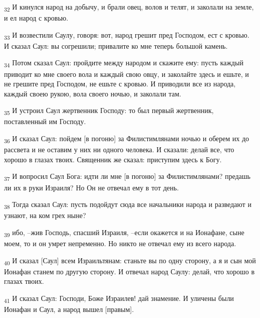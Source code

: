 \begin{tcolorbox}
\textsubscript{32} И кинулся народ на добычу, и брали овец, волов и телят, и заколали на земле, и ел народ с кровью.
\end{tcolorbox}
\begin{tcolorbox}
\textsubscript{33} И возвестили Саулу, говоря: вот, народ грешит пред Господом, ест с кровью. И сказал Саул: вы согрешили; привалите ко мне теперь большой камень.
\end{tcolorbox}
\begin{tcolorbox}
\textsubscript{34} Потом сказал Саул: пройдите между народом и скажите ему: пусть каждый приводит ко мне своего вола и каждый свою овцу, и заколайте здесь и ешьте, и не грешите пред Господом, не ешьте с кровью. И приводили все из народа, каждый своею рукою, вола своего ночью, и заколали там.
\end{tcolorbox}
\begin{tcolorbox}
\textsubscript{35} И устроил Саул жертвенник Господу: то был первый жертвенник, поставленный им Господу.
\end{tcolorbox}
\begin{tcolorbox}
\textsubscript{36} И сказал Саул: пойдем [в погоню] за Филистимлянами ночью и оберем их до рассвета и не оставим у них ни одного человека. И сказали: делай все, что хорошо в глазах твоих. Священник же сказал: приступим здесь к Богу.
\end{tcolorbox}
\begin{tcolorbox}
\textsubscript{37} И вопросил Саул Бога: идти ли мне [в погоню] за Филистимлянами? предашь ли их в руки Израиля? Но Он не отвечал ему в тот день.
\end{tcolorbox}
\begin{tcolorbox}
\textsubscript{38} Тогда сказал Саул: пусть подойдут сюда все начальники народа и разведают и узнают, на ком грех ныне?
\end{tcolorbox}
\begin{tcolorbox}
\textsubscript{39} ибо, --жив Господь, спасший Израиля, --если окажется и на Ионафане, сыне моем, то и он умрет непременно. Но никто не отвечал ему из всего народа.
\end{tcolorbox}
\begin{tcolorbox}
\textsubscript{40} И сказал [Саул] всем Израильтянам: станьте вы по одну сторону, а я и сын мой Ионафан станем по другую сторону. И отвечал народ Саулу: делай, что хорошо в глазах твоих.
\end{tcolorbox}
\begin{tcolorbox}
\textsubscript{41} И сказал Саул: Господи, Боже Израилев! дай знамение. И уличены были Ионафан и Саул, а народ вышел [правым].
\end{tcolorbox}
